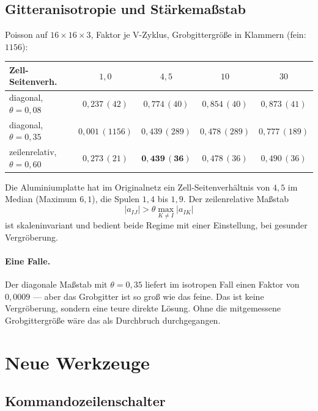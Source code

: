 \documentclass[11pt,a4paper]{article}
\begin{document}
\subsection{Gitteranisotropie und Stärkemaßstab}

Poisson auf $16\times16\times3$, Faktor je V-Zyklus, Grobgittergröße in
Klammern (fein: $1156$):

\begin{center}
\small
\begin{tabular}{lcccc}
\toprule
Zell-Seitenverh. & $1{,}0$ & $4{,}5$ & $10$ & $30$ \\
\midrule
diagonal, $\theta=0{,}08$    & $0{,}237\,(42)$  & $0{,}774\,(40)$ & $0{,}854\,(40)$ & $0{,}873\,(41)$ \\
diagonal, $\theta=0{,}35$    & $0{,}001\,(1156)$ & $0{,}439\,(289)$ & $0{,}478\,(289)$ & $0{,}777\,(189)$ \\
zeilenrelativ, $\theta=0{,}60$ & $0{,}273\,(21)$ & $\mathbf{0{,}439\,(36)}$ & $0{,}478\,(36)$ & $0{,}490\,(36)$ \\
\bottomrule
\end{tabular}
\end{center}

\noindent
Die Aluminiumplatte hat im Originalnetz ein Zell-Seiten\-ver\-hält\-nis von
$4{,}5$ im Median (Maximum $6{,}1$), die Spulen $1{,}4$ bis $1{,}9$. Der
zeilenrelative Maßstab
\[
  |a_{IJ}| > \theta \max_{K\neq I}|a_{IK}|
\]
ist skaleninvariant und bedient beide Regime mit einer Einstellung, bei
gesunder Vergröberung.

\paragraph{Eine Falle.} Der diagonale Maßstab mit $\theta=0{,}35$ liefert im
isotropen Fall einen Faktor von $0{,}0009$ --- aber das Grobgitter ist so groß
wie das feine. Das ist keine Vergröberung, sondern eine teure direkte Lösung.
Ohne die mitgemessene Grobgittergröße wäre das als Durchbruch durchgegangen.

\section{Neue Werkzeuge}

\subsection{Kommandozeilenschalter}
\end{document}
